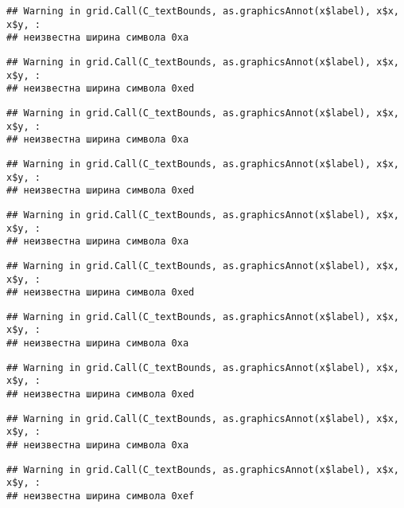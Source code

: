 \documentclass[
]{article}
\begin{document}
\begin{verbatim}
## Warning in grid.Call(C_textBounds, as.graphicsAnnot(x$label), x$x, x$y, :
## неизвестна ширина символа 0xa
\end{verbatim}

\begin{verbatim}
## Warning in grid.Call(C_textBounds, as.graphicsAnnot(x$label), x$x, x$y, :
## неизвестна ширина символа 0xed
\end{verbatim}

\begin{verbatim}
## Warning in grid.Call(C_textBounds, as.graphicsAnnot(x$label), x$x, x$y, :
## неизвестна ширина символа 0xa
\end{verbatim}

\begin{verbatim}
## Warning in grid.Call(C_textBounds, as.graphicsAnnot(x$label), x$x, x$y, :
## неизвестна ширина символа 0xed
\end{verbatim}

\begin{verbatim}
## Warning in grid.Call(C_textBounds, as.graphicsAnnot(x$label), x$x, x$y, :
## неизвестна ширина символа 0xa
\end{verbatim}

\begin{verbatim}
## Warning in grid.Call(C_textBounds, as.graphicsAnnot(x$label), x$x, x$y, :
## неизвестна ширина символа 0xed
\end{verbatim}

\begin{verbatim}
## Warning in grid.Call(C_textBounds, as.graphicsAnnot(x$label), x$x, x$y, :
## неизвестна ширина символа 0xa
\end{verbatim}

\begin{verbatim}
## Warning in grid.Call(C_textBounds, as.graphicsAnnot(x$label), x$x, x$y, :
## неизвестна ширина символа 0xed
\end{verbatim}

\begin{verbatim}
## Warning in grid.Call(C_textBounds, as.graphicsAnnot(x$label), x$x, x$y, :
## неизвестна ширина символа 0xa
\end{verbatim}

\begin{verbatim}
## Warning in grid.Call(C_textBounds, as.graphicsAnnot(x$label), x$x, x$y, :
## неизвестна ширина символа 0xef
\end{verbatim}
\end{document}
